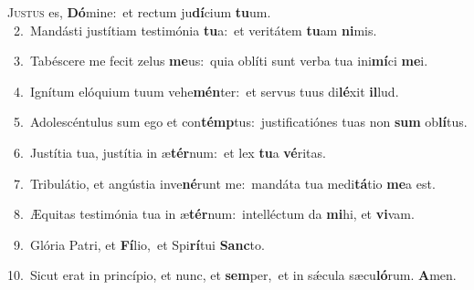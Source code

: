 \lettrine{\initial\textcolor{\initialcolor}{J}}{ustus} es, \textbf{Dó}\-mine:~\star et rectum ju\-\textbf{dí}\-cium \textbf{tu}\-um.\\
{\numbfont\textcolor{\numbcolor}{~2.}}~Mandásti justítiam testimónia \textbf{tu}\-a:~\star et veritátem \textbf{tu}\-am \textbf{ni}\-mis.\par
{\numbfont\textcolor{\numbcolor}{~3.}}~Tabéscere me fecit zelus \textbf{me}\-us:~\star quia oblíti sunt verba tua ini\-\textbf{mí}\-ci \textbf{me}\-i.\par
{\numbfont\textcolor{\numbcolor}{~4.}}~Ignítum elóquium tuum vehe\-\textbf{mén}\-ter:~\star et servus tuus di\-\textbf{lé}\-xit \textbf{il}\-lud.\par
{\numbfont\textcolor{\numbcolor}{~5.}}~Adolescéntulus sum ego et con\-\textbf{témp}\-tus:~\star justificatiónes tuas non \textbf{sum} ob\-\textbf{lí}\-tus.\par
{\numbfont\textcolor{\numbcolor}{~6.}}~Justítia tua, justítia in æ\-\textbf{tér}\-num:~\star et lex \textbf{tu}\-a \textbf{vé}\-ritas.\par
{\numbfont\textcolor{\numbcolor}{~7.}}~Tribulátio, et angústia inve\-\textbf{né}\-runt me:~\star mandáta tua medi\-\textbf{tá}\-tio \textbf{me}\-a est.\par
{\numbfont\textcolor{\numbcolor}{~8.}}~Æquitas testimónia tua in æ\-\textbf{tér}\-num:~\star intelléctum da \textbf{mi}\-hi, et \textbf{vi}\-vam.\par
{\numbfont\textcolor{\numbcolor}{~9.}}~Glória Patri, et \textbf{Fí}\-lio,~\star et Spi\-\textbf{rí}\-tui \textbf{Sanc}\-to.\par
{\numbfont\textcolor{\numbcolor}{10.}}~Sicut erat in princípio, et nunc, et \textbf{sem}\-per,~\star et in sǽcula sæcu\-\textbf{ló}\-rum. \textbf{A}\-men.\par
